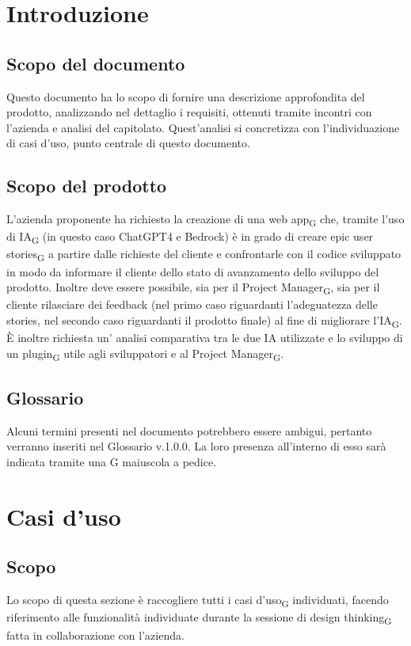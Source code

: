 \documentclass{article}
\begin{document}
\section*{Introduzione}

\subsection*{Scopo del documento}

Questo documento ha lo scopo di fornire una descrizione approfondita del prodotto, analizzando nel dettaglio i requisiti, ottenuti tramite incontri con l'azienda e analisi del capitolato. Quest'analisi si concretizza con l'individuazione di casi d'uso, punto centrale di questo documento.


\subsection*{Scopo del prodotto}
L'azienda proponente ha richiesto la creazione di una web app\textsubscript{G} che, tramite l'uso di IA\textsubscript{G} (in questo caso ChatGPT4 e Bedrock) è in grado di creare epic user stories\textsubscript{G} a partire dalle richieste del cliente e confrontarle con il codice sviluppato in modo da informare il cliente dello stato di avanzamento dello sviluppo del prodotto. Inoltre deve essere possibile, sia per il Project Manager\textsubscript{G}, sia per il cliente rilasciare dei feedback (nel primo caso riguardanti l'adeguatezza delle stories, nel secondo caso riguardanti il prodotto finale) al fine di migliorare l'IA\textsubscript{G}. È inoltre richiesta un' analisi comparativa tra le due IA utilizzate e lo sviluppo di un plugin\textsubscript{G} utile agli sviluppatori e al Project Manager\textsubscript{G}.

\subsection*{Glossario}
Alcuni termini presenti nel documento potrebbero essere ambigui, pertanto verranno inseriti nel Glossario v.1.0.0. La loro presenza all'interno di esso sarà indicata tramite una G maiuscola a pedice.

\section*{Casi d'uso}
\subsection*{Scopo}
Lo scopo di questa sezione è raccogliere tutti i casi d'uso\textsubscript{G} individuati, facendo riferimento alle funzionalità individuate durante la sessione di design thinking\textsubscript{G} fatta in collaborazione con l'azienda.
\end{document}
